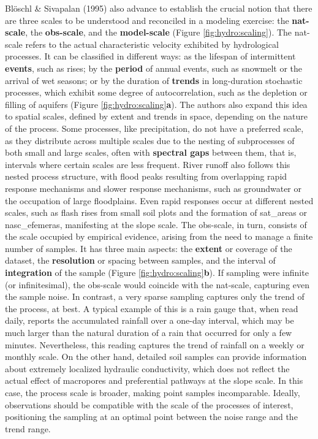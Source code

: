 \documentclass[./main_en.tex]{subfiles}
\begin{document}
\par Blöschl \& Sivapalan (1995) also advance to establish the crucial notion that there are three scales to be understood and reconciled in a modeling exercise: the \textbf{\gls{nat-scale}}, the \textbf{\gls{obs-scale}}, and the \textbf{\gls{model-scale}} (Figure \ref{fig:hydro:scaling}). The \gls{nat-scale} refers to the actual characteristic velocity exhibited by hydrological processes. It can be classified in different ways: as the lifespan of intermittent \textbf{events}, such as rises; by the \textbf{period} of annual events, such as snowmelt or the arrival of wet seasons; or by the duration of \textbf{trends} in long-duration stochastic processes, which exhibit some degree of autocorrelation, such as the depletion or filling of aquifers (Figure \ref{fig:hydro:scaling}\textbf{a}). The authors also expand this idea to spatial scales, defined by extent and trends in space, depending on the nature of the process. Some processes, like precipitation, do not have a preferred scale, as they distribute across multiple scales due to the nesting of subprocesses of both small and large scales, often with \textbf{spectral gaps} between them, that is, intervals where certain scales are less frequent. River runoff also follows this nested process structure, with flood peaks resulting from overlapping rapid response mechanisms and slower response mechanisms, such as groundwater or the occupation of large floodplains. Even rapid responses occur at different nested scales, such as flash rises from small soil plots and the formation of \gls{sat_areas} or \gls{nasc_efemeras}, manifesting at the slope scale. The \gls{obs-scale}, in turn, consists of the scale occupied by empirical evidence, arising from the need to manage a finite number of samples. It has three main aspects: the \textbf{extent} or coverage of the dataset, the \textbf{resolution} or spacing between samples, and the interval of \textbf{integration} of the sample (Figure \ref{fig:hydro:scaling}\textbf{b}). If sampling were infinite (or infinitesimal), the \gls{obs-scale} would coincide with the \gls{nat-scale}, capturing even the sample noise. In contrast, a very sparse sampling captures only the trend of the process, at best. A typical example of this is a rain gauge that, when read daily, reports the accumulated rainfall over a one-day interval, which may be much larger than the natural duration of a rain that occurred for only a few minutes. Nevertheless, this reading captures the trend of rainfall on a weekly or monthly scale. On the other hand, detailed soil samples can provide information about extremely localized hydraulic conductivity, which does not reflect the actual effect of macropores and preferential pathways at the slope scale. In this case, the process scale is broader, making point samples incomparable. Ideally, observations should be compatible with the scale of the processes of interest, positioning the sampling at an optimal point between the noise range and the trend range.
\end{document}
